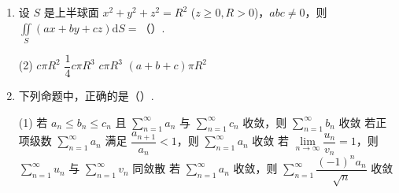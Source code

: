\documentclass[../Main.tex]{subfiles}
\begin{document}
\begin{enumerate}
        \begin{tasks}[label=\textbf{\Alph*.}, label-width=1.5em, column-sep=1em](1)
          \task \( I = 2\pi \displaystyle\int_0^1 r \mathrm{d}r \displaystyle\int_0^1 f(\sqrt{r^2 + z}) \mathrm{d}z \)
          \task \( I = 2\pi \displaystyle\int_0^1 r \mathrm{d}r \displaystyle \int_r^1 f(\sqrt{r^2 + z}) \mathrm{d}z \)
          \task \( I = 2\pi \displaystyle\int_0^1 \mathrm{d}r \displaystyle\int_r^1 f(\sqrt{r^2 + z}) \mathrm{d}z \)
          \task \( I = 2\pi \displaystyle\int_0^1 \mathrm{d}z \displaystyle \int_0^z f(\sqrt{r^2 + z}) \mathrm{d}r \)
        \end{tasks}

  \item 设 \( S \) 是上半球面 \( x^2 + y^2 + z^2 = R^2 \) (\( z \geq 0, R > 0 \))，\( abc \neq 0 \)，则 \( \displaystyle\iint \limits_S (ax + by + cz) \mathrm{d}S = \)（\qquad）.

        \begin{tasks}[label=\textbf{\Alph*.}, label-width=1.5em, column-sep=1em](2)
          \task \( c\pi R^2 \)
          \task \( \dfrac{1}{4}c\pi R^3 \)
          \task \( c\pi R^3 \)
          \task \( (a + b + c)\pi R^2 \)
        \end{tasks}
  \item 下列命题中，正确的是（\qquad）.

        \begin{tasks}[label=\textbf{\Alph*.}, label-width=1.5em, column-sep=1em](1)
          \task 若 \( a_n \leq b_n \leq c_n \) 且 \( \sum \limits_{n=1}^{\infty} a_n \) 与 \( \sum \limits_{n=1}^{\infty} c_n \) 收敛，则 \( \sum \limits_{n=1}^{\infty} b_n \) 收敛
          \task 若正项级数 \( \sum \limits_{n=1}^{\infty} a_n \) 满足 \( \dfrac{a_{n+1}}{a_n} < 1 \)，则 \( \sum \limits_{n=1}^{\infty} a_n \) 收敛
          \task 若 \( \lim \limits_{n \to \infty} \dfrac{u_n}{v_n} = 1 \)，则 \( \sum \limits_{n=1}^{\infty} u_n \) 与 \( \sum \limits_{n=1}^{\infty} v_n \) 同敛散
          \task 若 \( \sum \limits_{n=1}^{\infty} a_n \) 收敛，则 \( \sum \limits_{n=1}^{\infty} \dfrac{(-1)^n a_n}{\sqrt{n}} \) 收敛
        \end{tasks}

\end{enumerate}
\end{document}
